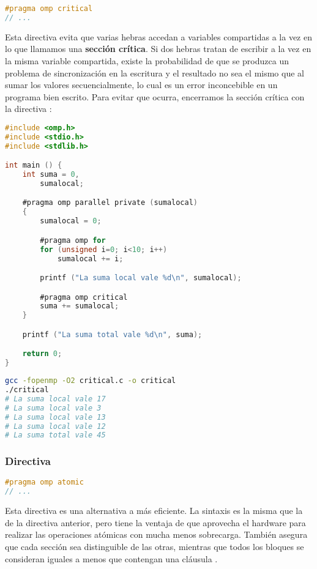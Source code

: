 \begin{lstlisting}[language=C]
#pragma omp critical
// ...
\end{lstlisting}

Esta directiva evita que varias hebras accedan a variables compartidas a la vez en lo que llamamos una \textbf{sección crítica}.
Si dos hebras tratan de escribir a la vez en la misma variable compartida, existe la probabilidad de que se produzca un problema de sincronización en la escritura y el resultado no sea el mismo que al sumar los valores secuencialmente, lo cual es un error inconcebible en un programa bien escrito.
Para evitar que ocurra, encerramos la sección crítica con la directiva :

\begin{lstlisting}[language=C]
#include <omp.h>
#include <stdio.h>
#include <stdlib.h>

int main () {
	int suma = 0,
	    sumalocal;

	#pragma omp parallel private (sumalocal)
	{
		sumalocal = 0;

		#pragma omp for
		for (unsigned i=0; i<10; i++)
			sumalocal += i;

		printf ("La suma local vale %d\n", sumalocal);

		#pragma omp critical
		suma += sumalocal;
	}

	printf ("La suma total vale %d\n", suma);

	return 0;
}
\end{lstlisting}

\begin{lstlisting}[language=sh]
gcc -fopenmp -O2 critical.c -o critical
./critical
# La suma local vale 17
# La suma local vale 3
# La suma local vale 13
# La suma local vale 12
# La suma total vale 45
\end{lstlisting}

\subsubsection{Directiva }

\begin{lstlisting}[language=C]
#pragma omp atomic
// ...
\end{lstlisting}

Esta directiva es una alternativa a  más eficiente.
La sintaxis es la misma que la de la directiva anterior, pero tiene la ventaja de que aprovecha el hardware para realizar las operaciones atómicas con mucha menos sobrecarga.
También asegura que cada sección  sea distinguible de las otras, mientras que todos los bloques  se consideran iguales a menos que contengan una cláusula .

